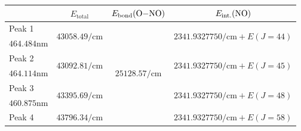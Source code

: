 \documentclass[aspectratio=43,handout]{ctexbeamer}
\begin{document}
	\begin{frame}{\insertsubsection}{\insertsubsubsection}
		\begin{table}[htbp]
			\centering
			\tiny
			\begin{tabularx}{0.9\textwidth}{lccc}
				\toprule
				                                  &                       $E_\text{total}$                        &         $E_\text{bond}(\ce{O-NO})$\footfullcite{ono}          &                            $E_\text{int.}(\ce{NO})$                            \\ \midrule
				Peak 1                            & \multirow{2}[2]{*}{$\num{43058.49}\unit{\per \centi \meter}$} & \multirow{8}[8]{*}{$\num{25128.57}\unit{\per \centi \meter}$} & \multirow{2}[2]{*}{$\num{2341.9327750}\unit{\per \centi \meter}+ E( J = 44 )$} \\
				$\num{464.484}\unit{\nano\meter}$ &                                                               &                                                               &                                                                                \\ \cmidrule{1-2}\cmidrule{4-4}
				Peak 2                            & \multirow{2}[2]{*}{$\num{43092.81}\unit{\per \centi \meter}$} &                                                               & \multirow{2}[2]{*}{$\num{2341.9327750}\unit{\per \centi \meter}+ E( J = 45 )$} \\
				$\num{464.114}\unit{\nano\meter}$ &                                                               &                                                               &                                                                                \\ \cmidrule{1-2}\cmidrule{4-4}
				Peak 3                            & \multirow{2}[2]{*}{$\num{43395.69}\unit{\per \centi \meter}$} &                                                               & \multirow{2}[2]{*}{$\num{2341.9327750}\unit{\per \centi \meter}+ E( J = 48 )$} \\
				$\num{460.875}\unit{\nano\meter}$ &                                                               &                                                               &                                                                                \\ \cmidrule{1-2}\cmidrule{4-4}
				Peak 4                            & \multirow{2}[2]{*}{$\num{43796.34}\unit{\per \centi \meter}$} &                                                               & \multirow{2}[2]{*}{$\num{2341.9327750}\unit{\per \centi \meter}+ E( J = 58 )$} \\

\end{tabularx}
\end{table}
\end{frame}
\end{document}
